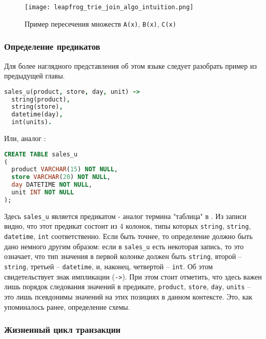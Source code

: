 \begin{figure}
	\centering
	\texttt{[image: leapfrog\_trie\_join\_algo\_intuition.png]}
	\caption{Пример пересечения множеств \lstinline{A(x)}, \lstinline{B(x)}, \lstinline{C(x)}}
	\label{fig:technology:logiql:leapfrog_trie_join_algo_intuition}
\end{figure}


\subsubsection{Определение предикатов}
\label{sec:technology:logiql:predicates}

Для более наглядного представления об этом языке следует разобрать пример из предыдущей главы.

\begin{lstlisting}[language=Prolog]
sales_u(product, store, day, unit) ->
  string(product),
  string(store),
  datetime(day),
  int(units).
\end{lstlisting}

Или, аналог \sql:

\begin{lstlisting}[language=SQL]
CREATE TABLE sales_u
(
  product VARCHAR(15) NOT NULL,
  store VARCHAR(20) NOT NULL,
  day DATETIME NOT NULL,
  unit INT NOT NULL
);
\end{lstlisting}

Здесь \lstinline{sales_u} является предикатом - аналог термина "таблица" в
\sql. Из записи видно, что этот предикат состоит из 4 колонок, типы которых \lstinline{string}, \lstinline{string}, \lstinline{datetime}, \lstinline{int} соответственно. Если быть точнее, то определение должно быть дано немного другим образом: если в \lstinline{sales_u} есть некоторая запись, то это означает, что тип значения в первой колонке должен быть \lstinline{string}, второй – \lstinline{string}, третьей – \lstinline{datetime}, и, наконец, четвертой – \lstinline{int}. Об этом свидетельствует знак импликации (\lstinline{->}). При этом стоит отметить, что здесь важен лишь порядок следования значений в предикате, \lstinline{product}, \lstinline{store}, \lstinline{day}, \lstinline{units} – это лишь псевдонимы значений на этих позициях в данном контексте. Это, как упоминалось ранее, определение схемы.

\subsubsection{Жизненный цикл транзакции}
\label{sec:technology:logiql:transaction}

